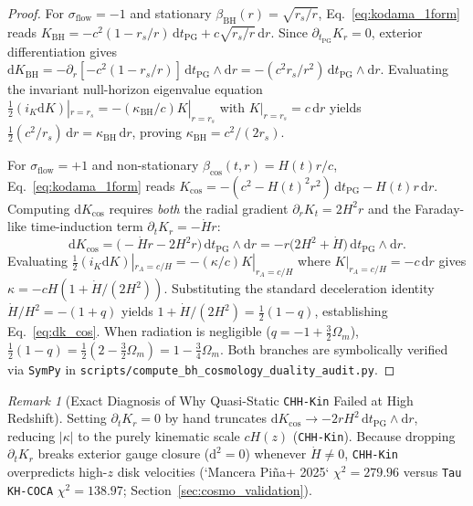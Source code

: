 \documentclass[11pt,a4paper]{article}
\theoremstyle{remark}
\newtheorem{remark}[theorem]{Remark}
\begin{document}
\begin{proof}
For $\sigma_{\mathrm{flow}} = -1$ and stationary $\beta_{\mathrm{BH}}(r) = \sqrt{r_s/r}$, Eq.~\eqref{eq:kodama_1form} reads $K_{\mathrm{BH}} = -c^2(1 - r_s/r)\,\mathrm{d}t_{\mathrm{PG}} + c\sqrt{r_s/r}\,\mathrm{d}r$. Since $\partial_{t_{\mathrm{PG}}} K_r = 0$, exterior differentiation gives $\mathrm{d}K_{\mathrm{BH}} = -\partial_r[-c^2(1 - r_s/r)]\,\mathrm{d}t_{\mathrm{PG}}\wedge\mathrm{d}r = -(c^2 r_s/r^2)\,\mathrm{d}t_{\mathrm{PG}}\wedge\mathrm{d}r$. Evaluating the invariant null-horizon eigenvalue equation $\frac{1}{2}(i_K \mathrm{d}K)|_{r=r_s} = -(\kappa_{\mathrm{BH}}/c)K|_{r=r_s}$ with $K|_{r=r_s} = c\,\mathrm{d}r$ yields $\frac{1}{2}(c^2/r_s)\,\mathrm{d}r = \kappa_{\mathrm{BH}}\,\mathrm{d}r$, proving $\kappa_{\mathrm{BH}} = c^2/(2r_s)$.

For $\sigma_{\mathrm{flow}} = +1$ and non-stationary $\beta_{\mathrm{cos}}(t, r) = H(t)r/c$, Eq.~\eqref{eq:kodama_1form} reads $K_{\mathrm{cos}} = -(c^2 - H(t)^2 r^2)\,\mathrm{d}t_{\mathrm{PG}} - H(t)r\,\mathrm{d}r$. Computing $\mathrm{d}K_{\mathrm{cos}}$ requires \emph{both} the radial gradient $\partial_r K_t = 2H^2 r$ and the Faraday-like time-induction term $\partial_t K_r = -\dot{H}r$:
\[
  \mathrm{d}K_{\mathrm{cos}} = \bigl(-\dot{H}r - 2H^2 r\bigr)\,\mathrm{d}t_{\mathrm{PG}} \wedge \mathrm{d}r = -r\bigl(2H^2 + \dot{H}\bigr)\,\mathrm{d}t_{\mathrm{PG}} \wedge \mathrm{d}r.
\]
Evaluating $\frac{1}{2}(i_K\mathrm{d}K)|_{r_A = c/H} = -(\kappa/c)K|_{r_A = c/H}$ where $K|_{r_A = c/H} = -c\,\mathrm{d}r$ gives $\kappa = -cH(1 + \dot{H}/(2H^2))$. Substituting the standard deceleration identity $\dot{H}/H^2 = -(1 + q)$ yields $1 + \dot{H}/(2H^2) = \frac{1}{2}(1 - q)$, establishing Eq.~\eqref{eq:dk_cos}. When radiation is negligible ($q = -1 + \frac{3}{2}\Omega_m$), $\frac{1}{2}(1 - q) = \frac{1}{2}(2 - \frac{3}{2}\Omega_m) = 1 - \frac{3}{4}\Omega_m$. Both branches are symbolically verified via \texttt{SymPy} in \texttt{scripts/\allowbreak compute\_\allowbreak bh\_\allowbreak cosmology\_\allowbreak duality\_\allowbreak audit.py}.
\end{proof}

\begin{remark}[Exact Diagnosis of Why Quasi-Static \texttt{CHH-Kin} Failed at High Redshift]
Setting $\partial_t K_r = 0$ by hand truncates $\mathrm{d}K_{\mathrm{cos}} \to -2rH^2\,\mathrm{d}t_{\mathrm{PG}}\wedge\mathrm{d}r$, reducing $|\kappa|$ to the purely kinematic scale $cH(z)$ (\texttt{CHH-Kin}). Because dropping $\partial_t K_r$ breaks exterior gauge closure ($\mathrm{d}^2 = 0$) whenever $\dot{H} \neq 0$, \texttt{CHH-Kin} overpredicts high-$z$ disk velocities (`Mancera Pi\~na+ 2025` $\chi^2 = 279.96$ versus \texttt{Tau KH-COCA} $\chi^2 = 138.97$; Section~\ref{sec:cosmo_validation}).
\end{remark}
\end{document}
